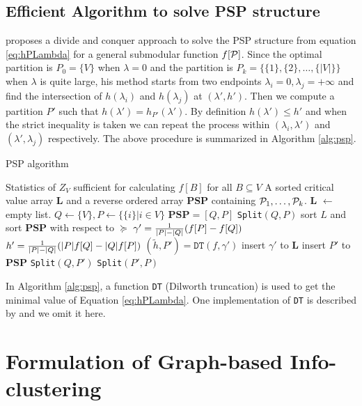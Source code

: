 \subsection{Efficient Algorithm to solve PSP structure}
\cite{narayanan} proposes a divide and conquer approach to solve the PSP structure from equation \eqref{eq:hPLambda} for a general submodular function $f[\P]$.
Since the optimal partition is $P_0 = \{V\}$ when $\lambda=0$ and the partition is $P_k=\{\{1\}, \{2\}, \dots, \{|V|\}\}$ when $\lambda$ is quite large,
his method starts from two endpoints $\lambda_i = 0, \lambda_j = +\infty$ and find the intersection of 
$h(\lambda_i)$ and $h(\lambda_j)$ at $(\lambda', h')$. Then we compute a partition $P'$ such that $h(\lambda') = h_{P'}(\lambda')$. By definition $h(\lambda') \leq h'$ and when the strict inequality is taken we can repeat the process within $(\lambda_i, \lambda')$ and $(\lambda', \lambda_j)$ respectively. The above procedure is summarized in Algorithm \ref{alg:psp}.
\begin{algorithm}
\caption{PSP algorithm}\label{alg:psp}
\begin{algorithmic}[1]
\REQUIRE Statistics of $Z_V$ sufficient for calculating $f[B]$ for all $B \subseteq V$
\ENSURE A sorted critical value array \textbf{L} and a reverse ordered array \textbf{PSP} containing $\P_1,\dots, \P_k$.
\STATE \textbf{L}  $\leftarrow$ empty list.
\STATE $Q\leftarrow \{V\}, P \leftarrow \{ \{i \} | i \in V\}$
\STATE $\mathbf{PSP}= [Q, P]$
\STATE \texttt{Split}$(Q,P)$
\STATE sort $L$ and sort $\mathbf{PSP}$ with respect to $\succeq$ 
 \STATE\label{alg:gamma} $\gamma' = {1 \over \abs{P} - \abs{Q}} (f[P]-f[Q])$
 \STATE $h' = {1 \over \abs{P} - \abs{Q}}(\abs{P} f[Q] - \abs{Q} f[P])$
 \STATE $(\tilde{h}, P') = \texttt{DT}(f,\gamma')$ \footnotemark
 	\STATE insert $\gamma'$ to $\mathbf{L}$
 \ELSE
 	\STATE insert $P'$ to $\mathbf{PSP}$
 	\STATE \texttt{Split}$(Q, P')$
 	\STATE \texttt{Split}$(P',P)$
 \ENDIF
\ENDFUNCTION
\end{algorithmic}
\end{algorithm}

In Algorithm \ref{alg:psp}, a function \texttt{DT} (Dilworth truncation) is used to get the minimal value of Equation \eqref{eq:hPLambda}.
One implementation of \texttt{DT} is described by \cite{mac} and we omit it here.

\section{Formulation of Graph-based Info-clustering}\label{sec:GBIC}

